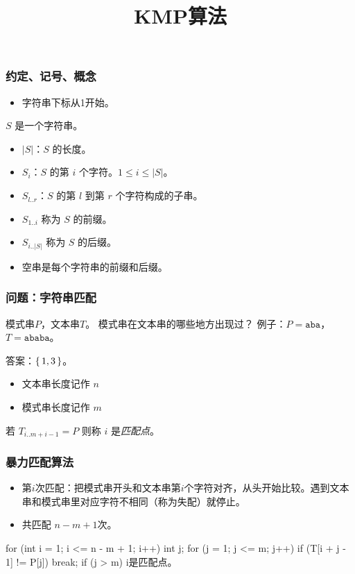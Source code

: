 \documentclass{ctexbeamer}
\newcommand{\str}[1]{\texttt{#1}}
\begin{document}
\title{KMP算法}
\maketitle

\begin{frame}
  \frametitle{约定、记号、概念}

  \begin{itemize}
    \item 字符串下标从1开始。
  \end{itemize}


$S$ 是一个字符串。
\begin{itemize}
\item $|S|$：$S$ 的长度。
\item  $S_i$：$S$ 的第 $i$ 个字符。$1 \le i \le |S|$。
\item $S_{l..r}$：$S$ 的第 $l$ 到第 $r$ 个字符构成的子串。
\item $S_{1..i}$ 称为 $S$ 的前缀。
\item $S_{i..|S|}$ 称为 $S$ 的后缀。
\item 空串是每个字符串的前缀和后缀。
\end{itemize}

\end{frame}
\begin{frame}[fragile]
	\frametitle{问题：字符串匹配}

  

\begin{tcolorbox}
  模式串$P$，文本串$T$。
  模式串在文本串的哪些地方出现过？
  \tcblower
  例子：$P=\str{aba}$，$T=\str{ababa}$。

  答案：$\set{1, 3}$。
\end{tcolorbox}


\begin{itemize}
\item 文本串长度记作 $n$
\item 模式串长度记作 $m$
\end{itemize}

若 $T_{i..m+i-1} = P$ 则称 $i$ 是\emph{匹配点}。

\end{frame}


\begin{frame}[fragile]
\frametitle{暴力匹配算法}

\begin{itemize}
\item 第$i$次匹配：把模式串开头和文本串第$i$个字符对齐，从头开始比较。遇到文本串和模式串里对应字符不相同（称为失配）就停止。
\item 共匹配 $n-m+1$次。
\end{itemize}


\begin{tcolorbox}
\begin{cverb}
for (int i = 1; i <= n - m + 1; i++) {
  int j;
  for (j = 1; j <= m; j++)
    if (T[i + j - 1] != P[j]) break;
  if (j > m)
    i是匹配点。
}
\end{cverb}
\end{tcolorbox}


\end{frame}
\end{document}

